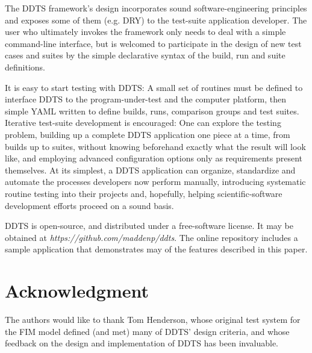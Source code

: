 \documentclass[conference]{IEEEtran}
\begin{document}
The DDTS framework's design incorporates sound software-engineering principles and exposes some of them (e.g. DRY) to the test-suite application developer. The user who ultimately invokes the framework only needs to deal with a simple command-line interface, but is welcomed to participate in the design of new test cases and suites by the simple declarative syntax of the build, run and suite definitions.

It is easy to start testing with DDTS: A small set of routines must be defined to interface DDTS to the program-under-test and the computer platform, then simple YAML written to define builds, runs, comparison groups and test suites. Iterative test-suite development is encouraged: One can explore the testing problem, building up a complete DDTS application one piece at a time, from builds up to suites, without knowing beforehand exactly what the result will look like, and employing advanced configuration options only as requirements present themselves. At its simplest, a DDTS application can organize, standardize and automate the processes developers now perform manually, introducing systematic routine testing into their projects and, hopefully, helping scientific-software development efforts proceed on a sound basis.

DDTS is open-source, and distributed under a free-software license. It may be obtained at \emph{https://github.com/maddenp/ddts}. The online repository includes a sample application that demonstrates may of the features described in this paper.

\section*{Acknowledgment}

The authors would like to thank Tom Henderson, whose original test system for the FIM model defined (and met) many of DDTS' design criteria, and whose feedback on the design and implementation of DDTS has been invaluable.
\end{document}
